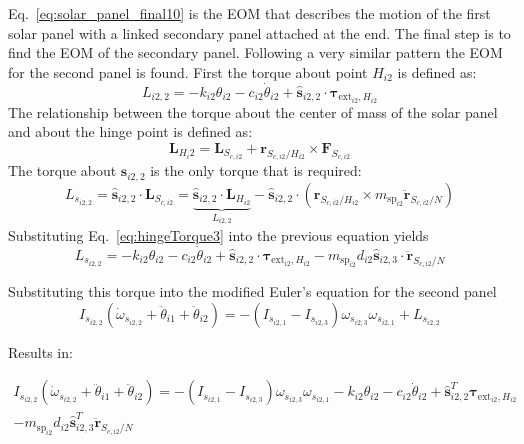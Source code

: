 Eq.~\eqref{eq:solar_panel_final10} is the EOM that describes the motion of the first solar panel with a linked secondary panel attached at the end. The final step is to find the EOM of the secondary panel. Following a very similar pattern the EOM for the second panel is found. First the torque about point $H_{i2}$ is defined as:
\begin{equation}
	L_{i2,2} = - k_{i2} \theta_{i2} - c_{i2} \dot{\theta}_{i2} + \hat{\bm s}_{i2,2} \cdot \bm \tau_{\text{ext}_{i2},H_{i2}}
	\label{eq:hingeTorque3}
\end{equation}
The relationship between the torque about the center of mass of the solar panel and about the hinge point is defined as:
\begin{equation}
	\bm L_{H_i2} = \bm L_{S_{c,i2}} + \bm r_{S_{c,i2}/H_{i2}} \times \bm F_{S_{c,i2}}
\end{equation}
The torque about $\hat{\bm s}_{i2,2}$ is the only torque that is required:
\begin{equation}
	L_{s_{i2,2}} = \hat{\bm s}_{i2,2} \cdot \bm L_{S_{c,i2}} =  \underbrace{\hat{\bm s}_{i2,2} \cdot \bm L_{H_{i2}}}_{L_{i2,2}}  -  \hat{\bm s}_{i2,2} \cdot \left(
	\bm r_{S_{c,i2}/H_{i2}} \times m_{\text{sp}_{i2}} \ddot{\bm r}_{S_{c,i2}/N} \right)
\end{equation}
Substituting Eq.~\eqref{eq:hingeTorque3} into the previous equation yields
\begin{equation}
	L_{s_{i2,2}} = - k_{i2} \theta_{i2} - c_{i2} \dot{\theta}_{i2} + \hat{\bm s}_{i2,2} \cdot \bm \tau_{\text{ext}_{i2},H_{i2}}  -  m_{\text{sp}_{i2}} d_{i2} \hat{\bm s}_{i2,3} \cdot \ddot{\bm r}_{S_{c,i2}/N}
\end{equation}

Substituting this torque into the modified Euler's equation for the second panel
\begin{equation}
	I_{s_{i2,2}} ( \dot\omega_{s_{i2,2}} + \ddot\theta_{i1} + \ddot\theta_{i2}) = - (I_{s_{i2,1}} - I_{s_{i2,3}}) \omega_{s_{i2,3}} \omega_{s_{i2,1}} + L_{s_{i2,2}}
\end{equation}

Results in:

\begin{multline}
	I_{s_{i2,2}} ( \dot\omega_{s_{i2,2}} + \ddot\theta_{i1} + \ddot\theta_{i2}) = - (I_{s_{i2,1}} - I_{s_{i2,3}}) \omega_{s_{i2,3}} \omega_{s_{i2,1}} - k_{i2} \theta_{i2} - c_{i2} \dot{\theta}_{i2} + \hat{\bm s}_{i2,2}^T \bm \tau_{\text{ext}_{i2},H_{i2}}  \\
	-  m_{\text{sp}_{i2}} d_{i2} \hat{\bm s}_{i2,3}^T \ddot{\bm r}_{S_{c,i2}/N}
\end{multline}

